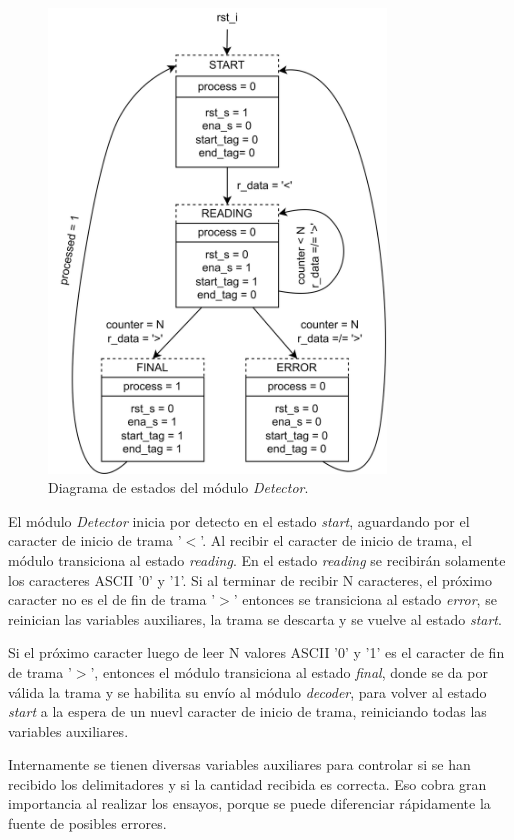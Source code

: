 \begin{figure}[H]
	\centering
	\includegraphics[width=0.8\textwidth]{Figuras/Detector_FSMD.png}
	\centering\caption{Diagrama de estados del módulo \textit{Detector}.}
	\label{fig:Detector_FSMD}
\end{figure}

El módulo \textit{Detector} inicia por detecto en el estado \textit{start}, aguardando por el caracter de inicio de trama '$<$'. Al recibir el caracter de inicio de trama, el módulo transiciona al estado \textit{reading}. En el estado \textit{reading} se recibirán solamente los caracteres ASCII '0' y '1'. Si al terminar de recibir N caracteres, el próximo caracter no es el de fin de trama '$>$' entonces se transiciona al estado \textit{error}, se reinician las variables auxiliares, la trama se descarta y se vuelve al estado \textit{start}.

Si el próximo caracter luego de leer N valores ASCII '0' y '1' es el caracter de fin de trama '$>$', entonces el módulo transiciona al estado \textit{final}, donde se da por válida la trama y se habilita su envío al módulo \textit{decoder}, para volver al estado \textit{start} a la espera de un nuevl caracter de inicio de trama, reiniciando todas las variables auxiliares.

Internamente se tienen diversas variables auxiliares para controlar si se han recibido los delimitadores y si la cantidad recibida es correcta. Eso cobra gran importancia al realizar los ensayos, porque se puede diferenciar rápidamente la fuente de posibles errores.